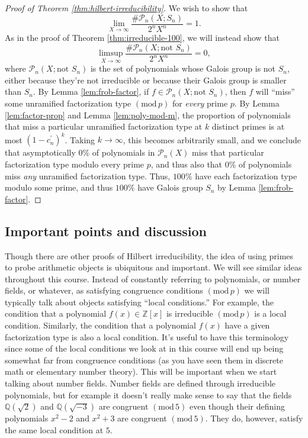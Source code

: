 \documentclass[12pt]{amsart}
\theoremstyle{definition} \newtheorem*{notation}{Notation}
\theoremstyle{remark} \newtheorem*{remark}{Remark}
\theoremstyle{remark} \newtheorem*{example}{Example}
\theoremstyle{definition} \newtheorem*{definition}{Definition}
\numberwithin{equation}{section}
\numberwithin{theorem}{section}
\renewcommand{\pmod}[1]{\left(\mathrm{mod}\,#1\right)}
\begin{document}
	\begin{proof}[Proof of Theorem \ref{thm:hilbert-irreducibility}]
		We wish to show that
			\[
				\lim_{X \to \infty} \frac{ \#\mathcal{P}_n(X;S_n)}{2^n X^n} = 1.
			\]
		As in the proof of Theorem \ref{thm:irreducible-100}, we will instead show that
			\[
				\limsup_{X \to \infty} \frac{ \#\mathcal{P}_n(X;\text{not } S_n)}{2^n X^n} = 0,
			\]
		where $\mathcal{P}_n(X;\text{not } S_n)$ is the set of polynomials whose Galois group is not $S_n$, either because they're not irreducible or because their Galois group is smaller than $S_n$.  By Lemma \ref{lem:frob-factor}, if $f \in \mathcal{P}_n(X;\text{not } S_n)$, then $f$ will ``miss'' some unramified factorization type $\pmod{p}$ for \emph{every} prime $p$.  By Lemma \ref{lem:factor-prop} and Lemma \ref{lem:poly-mod-m}, the proportion of polynomials that miss a particular unramified factorization type at $k$ distinct primes is at most $(1-c_n^\prime)^k$.  Taking $k \to \infty$, this becomes arbitrarily small, and we conclude that asymptotically $0\%$ of polynomials in $\mathcal{P}_n(X)$ miss that particular factorization type modulo every prime $p$, and thus also that $0\%$ of polynomials miss \emph{any} unramified factorization type.  Thus, $100\%$ have each factorization type modulo some prime, and thus $100\%$ have Galois group $S_n$ by Lemma \ref{lem:frob-factor}.
	\end{proof}
	
	\subsection{Important points and discussion}
	
	Though there are other proofs of Hilbert irreducibility, the idea of using primes to probe arithmetic objects is ubiquitous and important.  We will see similar ideas throughout this course.  Instead of constantly referring to polynomials, or number fields, or whatever, as satisfying congruence conditions $\pmod{p}$ we will typically talk about objects satisfying ``local conditions.'' For example, the condition that a polynomial $f(x) \in \mathbb{Z}[x]$ is irreducible $\pmod{p}$ is a local condition.  Similarly, the condition that a polynomial $f(x)$ have a given factorization type is also a local condition.  It's useful to have this terminology since some of the local conditions we look at in this course will end up being somewhat far from congruence conditions (as you have seen them in discrete math or elementary number theory).  This will be important when we start talking about number fields.  Number fields are defined through irreducible polynomials, but for example it doesn't really make sense to say that the fields $\mathbb{Q}(\sqrt{2})$ and $\mathbb{Q}(\sqrt{-3})$ are congruent $\pmod{5}$ even though their defining polynomials $x^2-2$ and $x^2+3$ are congruent $\pmod{5}$.  They do, however, satisfy the same local condition at $5$.
	
\end{document}
